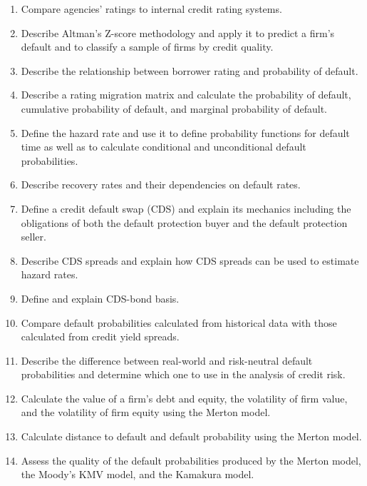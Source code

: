 
\begin{crkeybox}
\begin{enumerate}[label=\textbf{\alph*.},leftmargin=2em]
\item Compare agencies' ratings to internal credit rating systems.
\item Describe Altman's Z-score methodology and apply it to predict a firm's default and to classify a sample of firms by credit quality.
\item Describe the relationship between borrower rating and probability of default.
\item Describe a rating migration matrix and calculate the probability of default, cumulative probability of default, and marginal probability of default.
\item Define the hazard rate and use it to define probability functions for default time as well as to calculate conditional and unconditional default probabilities.
\item Describe recovery rates and their dependencies on default rates.
\item Define a credit default swap (CDS) and explain its mechanics including the obligations of both the default protection buyer and the default protection seller.
\item Describe CDS spreads and explain how CDS spreads can be used to estimate hazard rates.
\item Define and explain CDS-bond basis.
\item Compare default probabilities calculated from historical data with those calculated from credit yield spreads.
\item Describe the difference between real-world and risk-neutral default probabilities and determine which one to use in the analysis of credit risk.
\item Calculate the value of a firm's debt and equity, the volatility of firm value, and the volatility of firm equity using the Merton model.
\item Calculate distance to default and default probability using the Merton model.
\item Assess the quality of the default probabilities produced by the Merton model, the Moody's KMV model, and the Kamakura model.
\end{enumerate}
\end{crkeybox}

